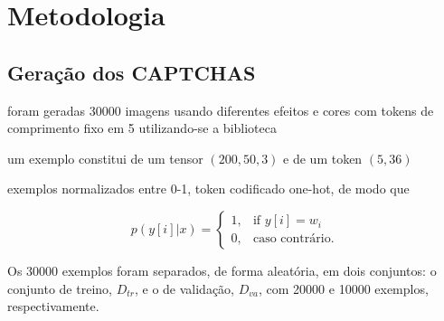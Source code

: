\chapter{Metodologia}

\section{Geração dos CAPTCHAS}

foram geradas 30000 imagens usando diferentes efeitos e cores com tokens de comprimento fixo em 5 utilizando-se a biblioteca \cite{simplecaptcha}

um exemplo constitui de um tensor $(200, 50, 3)$ e de um token $(5, 36)$

exemplos normalizados entre 0-1, token codificado one-hot, de modo que 

\begin{equation}
   p(y[i]|x)= 
	\begin{cases}
		1,	& \text{if } y[i]=w_i\\
		0,  & \text{caso contrário.}
	\end{cases}
\end{equation}

Os 30000 exemplos foram separados, de forma aleatória, em dois conjuntos:
o conjunto de treino, $D_{tr}$, e o de validação, $D_{va}$, com 20000 e 10000 exemplos, respectivamente.

